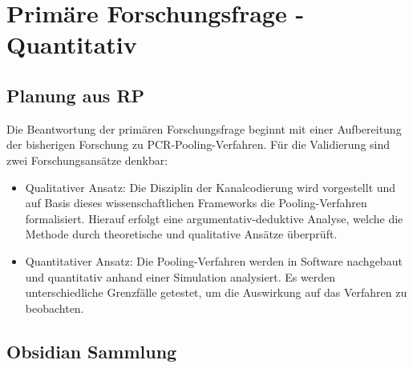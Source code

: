 \chapter{Primäre Forschungsfrage - Quantitativ}



\section{Planung aus RP}
Die Beantwortung der primären Forschungsfrage beginnt mit einer Aufbereitung der bisherigen Forschung zu PCR-Pooling-Verfahren.
Für die Validierung sind zwei Forschungsansätze denkbar:
\begin{itemize}
	\setlength{\itemsep}{-8pt}
	\item Qualitativer Ansatz:
	Die Disziplin der Kanalcodierung wird vorgestellt und auf Basis dieses wissenschaftlichen Frameworks die Pooling-Verfahren formalisiert.
	Hierauf erfolgt eine argumentativ-deduktive Analyse, welche die Methode durch theoretische und qualitative Ansätze überprüft.
	\item Quantitativer Ansatz:
	Die Pooling-Verfahren werden in Software nachgebaut und quantitativ anhand einer Simulation analysiert.
	Es werden unterschiedliche Grenzfälle getestet, um die Auswirkung auf das Verfahren zu beobachten.
\end{itemize}

\section{Obsidian Sammlung}
\fi